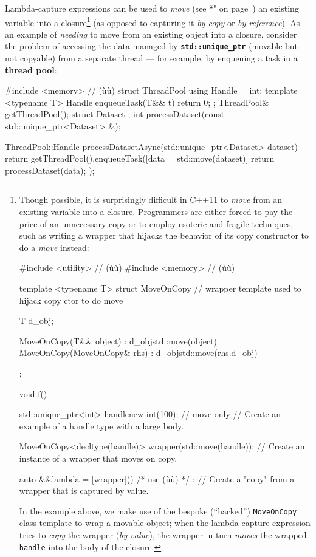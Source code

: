 Lambda-capture expressions can be used to \emph{move} (see
``" on page~\pageref{Rvalue-References}) an existing variable into a
closure{\cprotect\footnote{Though possible, it is surprisingly difficult
in C++11 to \emph{move} from an existing variable into a closure.
Programmers are either forced to pay the price of an unnecessary copy or to employ esoteric and fragile techniques, such as writing a wrapper
that hijacks the behavior of its copy constructor to do a \emph{move}
instead:

\begin{emcppslisting}[basicstyle={\ttfamily\footnotesize}]
#include <utility>  // (ù{}ù)
#include <memory>   // (ù{}ù)

template <typename T>
struct MoveOnCopy  // wrapper template used to hijack copy ctor to do move
{
    T d_obj;

    MoveOnCopy(T&& object) : d_obj{std::move(object)} { }
    MoveOnCopy(MoveOnCopy& rhs) : d_obj{std::move(rhs.d_obj)} { }
};

void f()
{
    std::unique_ptr<int> handle{new int(100)};  // move-only
        // Create an example of a handle type with a large body.

    MoveOnCopy<decltype(handle)> wrapper(std::move(handle));
        // Create an instance of a wrapper that moves on copy.

    auto &&lambda = [wrapper](){ /* use (ù{}ù) */ };
        // Create a "copy" from a wrapper that is captured by value.
}
\end{emcppslisting}
    
\noindent In the example above, we make use of the bespoke (``hacked'')
\texttt{MoveOnCopy} class template to wrap a movable object;
when the lambda-capture expression tries to \emph{copy} the wrapper (\textit{by value}),
the wrapper in turn \emph{moves} the wrapped
  \texttt{handle} into the body of the closure.}} (as opposed to
capturing it \emph{by copy} or \emph{by reference}). As an example of
\emph{needing} to move from an existing object into a closure, consider
the problem of accessing the data managed by
\textbf{\texttt{std::unique\_ptr}} (movable but not copyable) from a
separate thread --- for example, by enqueuing a task in a \textbf{thread
pool}:

\begin{emcppshiddenlisting}[emcppsbatch=e1,emcppsstandards={c++14}]
#include <memory>   // (ù{}ù)
struct ThreadPool {
  using Handle = int;
  template <typename T>
  Handle enqueueTask(T&& t) { return 0; }
};
ThreadPool& getThreadPool();
struct Dataset {};
int processDataset(const std::unique_ptr<Dataset> &);
\end{emcppshiddenlisting}
\begin{emcppslisting}[emcppsbatch=e1]
ThreadPool::Handle processDatasetAsync(std::unique_ptr<Dataset> dataset)
{
    return getThreadPool().enqueueTask([data = std::move(dataset)]
    {
        return processDataset(data);
    });
}
\end{emcppslisting}
    
